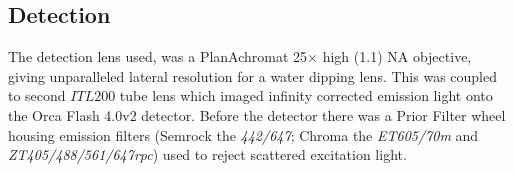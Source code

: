 

\subsection{Detection}

The detection lens used, was a PlanAchromat \SI{25}{}$\times$ high (\SI{1.1}{}) \acrshort{NA} objective, giving unparalleled lateral resolution for a water dipping lens.
This was coupled to second $ITL200$ tube lens which imaged infinity corrected emission light onto the Orca Flash 4.0v2 detector.
Before the detector there was a Prior Filter wheel housing emission filters (Semrock the \emph{442/647}; Chroma the \emph{ET605/70m} and \emph{ZT405/488/561/647rpc}) used to reject scattered excitation light.

